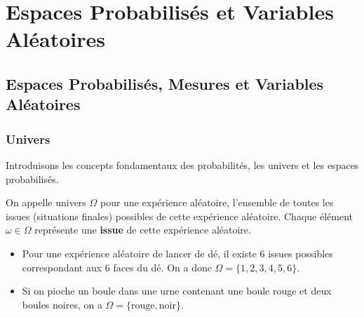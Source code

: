 \chapter{Espaces Probabilisés et Variables Aléatoires}

\justify

\setlength{\parindent}{0pt}
\renewcommand{\labelitemi}{\textbullet} %





\section{Espaces Probabilisés, Mesures et Variables Aléatoires}

\subsection{Univers}

Introduisons les concepts fondamentaux des probabilités, les univers et les espaces probabilisés. 

\begin{definition}[Univers]
    On appelle univers $\Omega$ pour une expérience aléatoire, l'ensemble de toutes les issues (situations finales) possibles 
    de cette expérience aléatoire. Chaque élément $ \omega \in \Omega$ représente une \textbf{issue} de cette expérience aléatoire.  
\end{definition}

\begin{example}
    \begin{itemize}
        \item Pour une expérience aléatoire de lancer de dé, il existe 6 issues possibles correspondant aux 6 faces du dé. 
        On a donc $\Omega = \{1, 2, 3, 4, 5, 6\}$. 
        \item Si on pioche un boule dans une urne contenant une boule rouge et deux boules noires, on a 
        $ \Omega = \{\text{rouge}, \text{noir}\}$. 
    \end{itemize}
\end{example}

